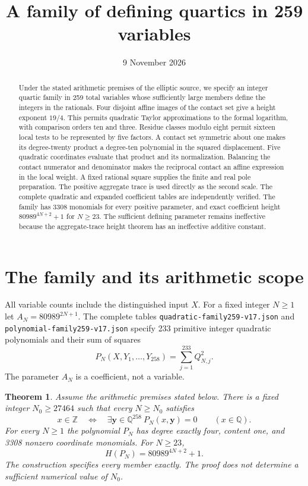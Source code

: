 \documentclass[11pt,a4paper]{article}
\title{A family of defining quartics in 259 variables}
\author{}\date{9 November 2026}
\newtheorem{theorem}{Theorem}[section]\newtheorem{lemma}[theorem]{Lemma}
\newcommand{\Q}{\mathbb Q}\newcommand{\Z}{\mathbb Z}\newcommand{\HH}{\mathcal H}
\begin{document}
\maketitle
\begin{abstract}
Under the stated arithmetic premises of the elliptic source, we specify
an integer quartic family in 259 total variables whose sufficiently
large members define the integers in the rationals. Four disjoint
affine images of the contact set give a height exponent $19/4$. This permits
quadratic Taylor approximations to the formal logarithm, with comparison
orders ten and three. Residue classes modulo eight permit sixteen local tests to be represented
by five factors. A contact set symmetric about one makes its degree-twenty product
a degree-ten polynomial in the squared displacement. Five quadratic
coordinates evaluate that product and its normalization. Balancing the
contact numerator and denominator makes the reciprocal contact an affine
expression in the local weight. A fixed rational square supplies the
finite and real pole preparation. The positive aggregate trace is used
directly as the second scale. The complete
quadratic and expanded coefficient tables are independently verified.
The family has 3308 monomials for every positive parameter, and exact
coefficient height $80989^{4N+2}+1$ for $N\ge23$. The sufficient defining
parameter remains ineffective because the aggregate-trace height theorem
has an ineffective additive constant.
\end{abstract}

\section{The family and its arithmetic scope}
All variable counts include the distinguished input $X$. For a fixed
integer $N\ge1$ let $A_N=80989^{2N+1}$. The complete tables
\nolinkurl{quadratic-family259-v17.json} and
\nolinkurl{polynomial-family259-v17.json} specify 233 primitive integer
quadratic polynomials and their sum of squares
\[
 P_N(X,Y_1,\ldots,Y_{258})=\sum_{j=1}^{233}Q_{N,j}^2.
\]
The parameter $A_N$ is a coefficient, not a variable.

\begin{theorem}\label{thm:main}
Assume the arithmetic premises stated below. There is a fixed integer
$N_0\ge27464$ such that every $N\ge N_0$ satisfies
\[
 x\in\Z\quad\Longleftrightarrow\quad
 \exists\mathbf y\in\Q^{258}\ P_N(x,\mathbf y)=0
 \qquad(x\in\Q).
\]
For every $N\ge1$ the polynomial $P_N$ has degree exactly four,
content one, and 3308 nonzero coordinate monomials. For $N\ge23$,
\[
                       H(P_N)=80989^{4N+2}+1.
\]
The construction specifies every member exactly. The proof does not
determine a sufficient numerical value of $N_0$.
\end{theorem}
\end{document}
